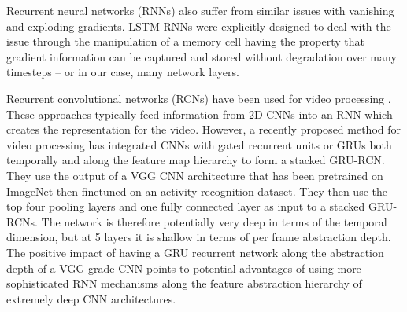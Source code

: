 \documentclass{article}
\begin{document}
Recurrent neural networks (RNNs) also suffer from similar issues with vanishing and exploding gradients. LSTM RNNs were explicitly designed to deal with the issue through the manipulation of a memory cell having the property that gradient information can be captured and stored without degradation over many timesteps -- or in our case, many network layers.

Recurrent convolutional networks (RCNs) have been used for video processing \cite{srivastava2015unsupervised,donahue2014long}. These approaches typically feed information from 2D CNNs into an RNN which creates the representation for the video.
%
However, a recently proposed method for video processing \cite{ballas2015delving} has integrated CNNs with gated recurrent units or GRUs \cite{chung2014empirical} both temporally and along the feature map hierarchy to form a stacked GRU-RCN. They use the output of a VGG CNN architecture that has been pretrained on ImageNet \cite{simonyan2014very} then finetuned on an activity recognition dataset. They then use the top four pooling layers and one fully connected layer as input to a stacked GRU-RCNs. The network is therefore potentially very deep in terms of the temporal dimension, but at 5 layers it is shallow in terms of per frame abstraction depth. The positive impact of having a GRU recurrent network along the abstraction depth of a VGG grade CNN points to potential advantages of using more sophisticated RNN mechanisms along the feature abstraction hierarchy of extremely deep CNN architectures.
\end{document}
